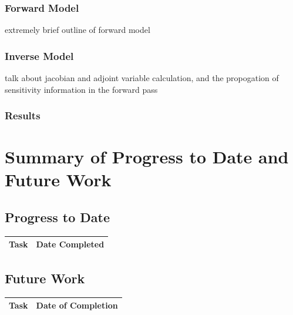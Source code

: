 \documentclass[titlepage,12pt,letterpaper]{article}
\begin{document}
\subsubsection{Forward Model}\label{DA_work:DA_project:forward_model}

extremely brief outline of forward model


\subsubsection{Inverse Model}\label{DA_work:DA_project:inverse_model}

talk about jacobian and adjoint variable calculation, and the propogation of sensitivity information in the forward pass


\subsubsection{Results}


\newpage

\clearpage
\section{Summary of Progress to Date and Future Work}
\subsection{Progress to Date}

\begin{tabular}{|l|c|} \hline
\multicolumn{1}{|c|}{\bf{Task}} & \multicolumn{1}{|c|}{\bf{Date
    Completed}} \\




\hline
\end{tabular}

\subsection{Future Work}

\begin{tabular}{|l|c|} \hline
\multicolumn{1}{|c|}{\bf{Task}} & \multicolumn{1}{|c|}{\bf{
    Date of Completion}} \\

\hline
\end{tabular}

\newpage
 

\end{document}
